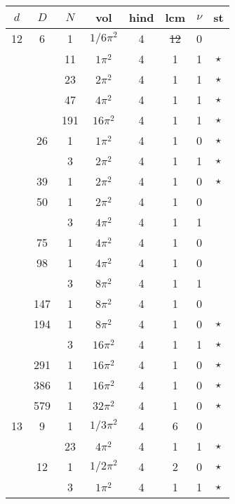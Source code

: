 \documentclass[12pt]{amsart}
\providecommand{\DIFadd}[1]{{\protect\color{blue}\uwave{#1}}} %
\providecommand{\DIFdel}[1]{{\protect\color{red}\sout{#1}}}                      %
\providecommand{\DIFaddbegin}{} %
\providecommand{\DIFaddend}{} %
\providecommand{\DIFdelbegin}{} %
\providecommand{\DIFdelend}{} %
\begin{document}
\begin{tabular}{ccc|ccccc}
$d$ & $D$ & $N$ & vol & hind & lcm & $\nu$ & st\\
\hline
12 & 6 & 1 & \DIFdelbegin \DIFdel{$1/6\pi^2$ }\DIFdelend \DIFaddbegin \DIFadd{$(1/6)\pi^2$ }\DIFaddend & 4 & \DIFdelbegin \DIFdel{12 }\DIFdelend \DIFaddbegin \DIFadd{6 }\DIFaddend & 0 &  \\
 &  & 11 & \DIFdelbegin \DIFdel{$1\pi^2$ }\DIFdelend \DIFaddbegin \DIFadd{$\pi^2$ }\DIFaddend & 4 & 1 & 1 & $\star$ \\
 &  & 23 & $2\pi^2$ & 4 & 1 & 1 & $\star$ \\
 &  & 47 & $4\pi^2$ & 4 & 1 & 1 & $\star$ \\
 &  & 191 & $16\pi^2$ & 4 & 1 & 1 & $\star$ \\
 & 26 & 1 & \DIFdelbegin \DIFdel{$1\pi^2$ }\DIFdelend \DIFaddbegin \DIFadd{$\pi^2$ }\DIFaddend & 4 & 1 & 0 & $\star$ \\
 &  & 3 & $2\pi^2$ & 4 & 1 & 1 & $\star$ \\
 & 39 & 1 & $2\pi^2$ & 4 & 1 & 0 & $\star$ \\
 & 50 & 1 & $2\pi^2$ & 4 & 1 & 0 &  \\
 &  & 3 & $4\pi^2$ & 4 & 1 & 1 &  \\
 & 75 & 1 & $4\pi^2$ & 4 & 1 & 0 &  \\
 & 98 & 1 & $4\pi^2$ & 4 & 1 & 0 &  \\
 &  & 3 & $8\pi^2$ & 4 & 1 & 1 &  \\
 & 147 & 1 & $8\pi^2$ & 4 & 1 & 0 &  \\
 & 194 & 1 & $8\pi^2$ & 4 & 1 & 0 & $\star$ \\
 &  & 3 & $16\pi^2$ & 4 & 1 & 1 & $\star$ \\
 & 291 & 1 & $16\pi^2$ & 4 & 1 & 0 & $\star$ \\
 & 386 & 1 & $16\pi^2$ & 4 & 1 & 0 & $\star$ \\
 & 579 & 1 & $32\pi^2$ & 4 & 1 & 0 & $\star$ \\
13 & 9 & 1 & \DIFdelbegin \DIFdel{$1/3\pi^2$ }\DIFdelend \DIFaddbegin \DIFadd{$(1/3)\pi^2$ }\DIFaddend & 4 & 6 & 0 &  \\
 &  & 23 & $4\pi^2$ & 4 & 1 & 1 & $\star$ \\
 & 12 & 1 & \DIFdelbegin \DIFdel{$1/2\pi^2$ }\DIFdelend \DIFaddbegin \DIFadd{$(1/2)\pi^2$ }\DIFaddend & 4 & 2 & 0 & $\star$ \\
 &  & 3 & \DIFdelbegin \DIFdel{$1\pi^2$ }\DIFdelend \DIFaddbegin \DIFadd{$\pi^2$ }\DIFaddend & 4 & 1 & 1 & $\star$ \\

\end{tabular}
\end{document}
